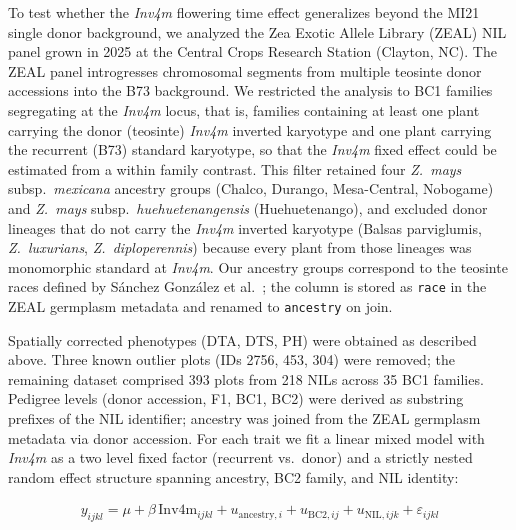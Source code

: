 \documentclass[9pt,twocolumn,twoside]{rilabRxiv}
\newcommand{\invfour}{\textit{Inv4m}\xspace}
\begin{document}
To test whether the \invfour flowering time effect generalizes beyond the MI21 single donor background, we analyzed the Zea Exotic Allele Library (ZEAL) NIL panel grown in 2025 at the Central Crops Research Station (Clayton, NC).
The ZEAL panel introgresses chromosomal segments from multiple teosinte donor accessions into the B73 background.
We restricted the analysis to BC1 families segregating at the \invfour locus, that is, families containing at least one plant carrying the donor (teosinte) \invfour inverted karyotype and one plant carrying the recurrent (B73) standard karyotype, so that the \invfour fixed effect could be estimated from a within family contrast.
This filter retained four \textit{Z.~mays} subsp.\ \textit{mexicana} ancestry groups (Chalco, Durango, Mesa-Central, Nobogame) and \textit{Z.~mays} subsp.\ \textit{huehuetenangensis} (Huehuetenango), and excluded donor lineages that do not carry the \invfour inverted karyotype (Balsas parviglumis, \textit{Z.~luxurians}, \textit{Z.~diploperennis}) because every plant from those lineages was monomorphic standard at \invfour.
Our ancestry groups correspond to the teosinte races defined by Sánchez González et al.~\cite{sanchez-gonzalez2018}; the column is stored as \texttt{race} in the ZEAL germplasm metadata and renamed to \texttt{ancestry} on join.

Spatially corrected phenotypes (DTA, DTS, PH) were obtained as described above.
Three known outlier plots (IDs 2756, 453, 304) were removed; the remaining dataset comprised 393 plots from 218 NILs across 35 BC1 families.
Pedigree levels (donor accession, F1, BC1, BC2) were derived as substring prefixes of the NIL identifier; ancestry was joined from the ZEAL germplasm metadata via donor accession.
For each trait we fit a linear mixed model with \invfour as a two level fixed factor (recurrent vs.\ donor) and a strictly nested random effect structure spanning ancestry, BC2 family, and NIL identity:

\begin{eqnarray}
\label{eq:zeal_lmm}
y_{ijkl} = \mu + \beta\,\mathrm{Inv4m}_{ijkl} + u_{\text{ancestry},i} + u_{\text{BC2},ij} + u_{\text{NIL},ijk} + \varepsilon_{ijkl}
\end{eqnarray}
\end{document}
